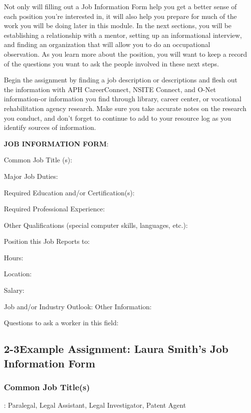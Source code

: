 Not only will filling out a Job Information Form help you get a better sense of each position you're interested in, it will also help you prepare for much of the work you will be doing later in this module. In the next sections, you will be establishing a relationship with a mentor, setting up an informational interview, and finding an organization that will allow you to do an occupational observation. As you learn more about the position, you will want to keep a record of the questions you want to ask the people involved in these next steps.

Begin the assignment by finding a job description or descriptions and flesh out the information with APH CareerConnect, NSITE Connect, and O-Net information-or information you find through library, career center, or vocational rehabilitation agency research. Make sure you take accurate notes on the research you conduct, and don't forget to continue to add to your resource log as you identify sources of information.

\pagebreak \textbf{JOB INFORMATION FORM}:

Common Job Title (s): \hrulefill

Major Job Duties: \hrulefill

Required Education and/or Certification(s): \hrulefill

Required Professional Experience: \hrulefill

Other Qualifications (special computer skills, languages, etc.):  \hrulefill

Position this Job Reports to: \hrulefill

Hours: \hrulefill

Location: \hrulefill

Salary: \hrulefill

Job and/or Industry Outlook: Other Information: \hrulefill

Questions to ask a worker in this field: \hrulefill

\pagebreak \subsection*{2-3\quad Example Assignment: Laura Smith’s Job Information Form}
\subsubsection*{Common Job Title(s)}: Paralegal, Legal Assistant, Legal Investigator, Patent Agent

